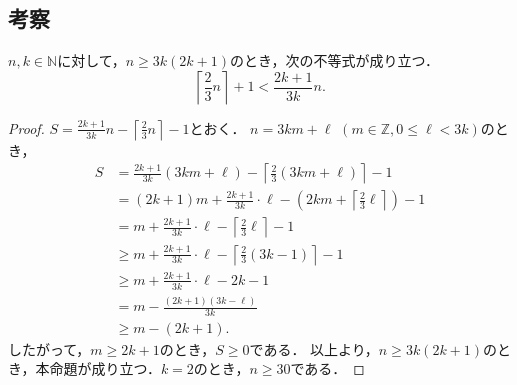 \subsection*{考察}

\begin{proposition}\label{prop:int4}
  $n, k\in\mathbb{N}$に対して，$n\geq 3k(2k + 1)$のとき，次の不等式が成り立つ．
  $$
  \left\lceil\frac{2}{3}n\right\rceil + 1 < \frac{2k+1}{3k}n.
  $$
  \end{proposition}
  \begin{proof}
  $\displaystyle S = \frac{2k+1}{3k}n - \left\lceil\frac{2}{3}n\right\rceil - 1$とおく．
  $n = 3k m + \ell$ $(m \in \mathbb{Z}, 0\leq \ell < 3k)$のとき，
  \begin{align*}
  S & = \frac{2k + 1}{3k}(3k m + \ell) - \left\lceil\frac{2}{3}(3k m + \ell)\right\rceil - 1\\
  & = (2k + 1)m + \frac{2k + 1}{3k}\cdot\ell - (2k m + \left\lceil\frac{2}{3}\ell\right\rceil) - 1\\
  &= m + \frac{2k + 1}{3k}\cdot\ell - \left\lceil\frac{2}{3}\ell\right\rceil - 1\\
  &\geq m + \frac{2k + 1}{3k}\cdot\ell - \left\lceil\frac{2}{3}(3k - 1)\right\rceil - 1\\
  &\geq m + \frac{2k + 1}{3k}\cdot\ell - 2k - 1\\
  &= m - \frac{(2k + 1)(3k - \ell)}{3k}\\
  &\geq m - (2k + 1).
  \end{align*}
  したがって，$m\geq 2k + 1$のとき，$S \geq 0$である．
  以上より，$n\geq 3k(2k + 1)$のとき，本命題が成り立つ．$k=2$のとき，$n\geq 30$である．
  \end{proof}
\fi
%